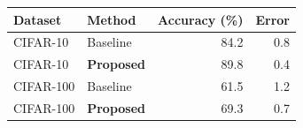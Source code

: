 \begin{tabular}{llrr}
\toprule
Dataset & Method & Accuracy (\%) & Error \\
\midrule
CIFAR-10 & Baseline & 84.2 & 0.8 \\
CIFAR-10 & \textbf{Proposed} & 89.8 & 0.4 \\
CIFAR-100 & Baseline & 61.5 & 1.2 \\
CIFAR-100 & \textbf{Proposed} & 69.3 & 0.7 \\
\bottomrule
\end{tabular}

